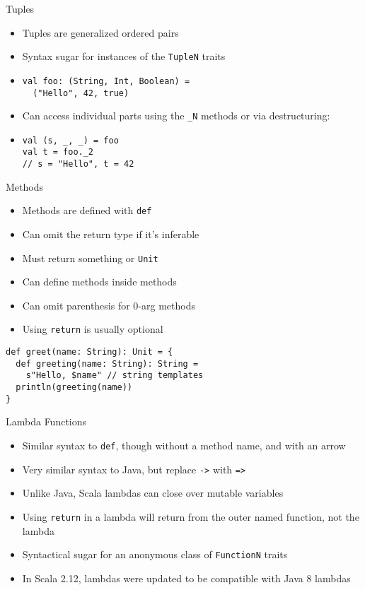 \documentclass{beamer}
\begin{document}
\begin{frame}[fragile]{Tuples}
\begin{itemize}
\item Tuples are generalized ordered pairs
\item Syntax sugar for instances of the \lstinline{TupleN} traits
\item
\begin{lstlisting}
val foo: (String, Int, Boolean) =
  ("Hello", 42, true)
\end{lstlisting}
\item Can access individual parts using the \lstinline{_N} methods or via destructuring:
\item
\begin{lstlisting}
val (s, _, _) = foo
val t = foo._2
// s = "Hello", t = 42
\end{lstlisting}
\end{itemize}
\end{frame}

\begin{frame}[fragile]{Methods}
\begin{itemize}
\item Methods are defined with \lstinline{def}
\item Can omit the return type if it's inferable
\item Must return something or \lstinline{Unit}
\item Can define methods inside methods
\item Can omit parenthesis for 0-arg methods
\item Using \lstinline{return} is usually optional
\end{itemize}
\begin{lstlisting}
def greet(name: String): Unit = {
  def greeting(name: String): String =
    s"Hello, $name" // string templates
  println(greeting(name))
}
\end{lstlisting}
\end{frame}

\begin{frame}[fragile]{Lambda Functions}
\begin{itemize}
\item Similar syntax to \lstinline{def}, though without a method name, and with an arrow
\item Very similar syntax to Java, but replace \lstinline{->} with \lstinline{=>}
\item Unlike Java, Scala lambdas can close over mutable variables
\item Using \lstinline{return} in a lambda will return from the outer named function, not the
lambda
\item Syntactical sugar for an anonymous class of \lstinline{FunctionN} traits
\item In Scala 2.12, lambdas were updated to be compatible with Java 8 lambdas
\end{itemize}
\end{frame}
\end{document}
